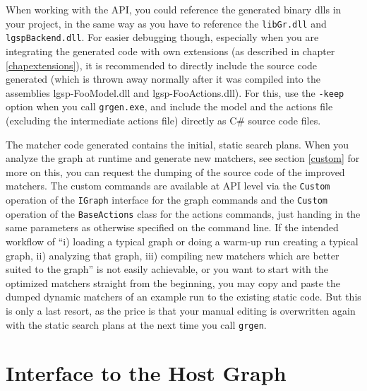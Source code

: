 When working with the API, you could reference the generated binary dlls in your project, in the same way as you have to reference the \texttt{libGr.dll} and \texttt{lgspBackend.dll}.
For easier debugging though, especially when you are integrating the generated code with own extensions (as described in chapter \ref{chapextensions}), it is recommended to directly include the source code generated (which is thrown away normally after it was compiled into the assemblies lgsp-FooModel.dll and lgsp-FooActions.dll).
For this, use the \texttt{-keep} option when you call \texttt{grgen.exe}, and include the model and the actions file (excluding the intermediate actions file) directly as C\# source code files.

The matcher code generated contains the initial, static search plans.
When you analyze the graph at runtime and generate new matchers, see section \ref{custom} for more on this, you can request the dumping of the source code of the improved matchers.
The custom commands are available at API level via the \texttt{Custom} operation of the \texttt{IGraph} interface for the graph commands and the \texttt{Custom} operation of the \texttt{BaseActions} class for the actions commands, just handing in the same parameters as otherwise specified on the command line.
If the intended workflow of ``i) loading a typical graph or doing a warm-up run creating a typical graph, ii) analyzing that graph, iii) compiling new matchers which are better suited to the graph'' is not easily achievable, or you want to start with the optimized matchers straight from the beginning, you may copy and paste the dumped dynamic matchers of an example run to the existing static code. 
But this is only a last resort, as the price is that your manual editing is overwritten again with the static search plans at the next time you call \texttt{grgen}.


\section{Interface to the Host Graph}

